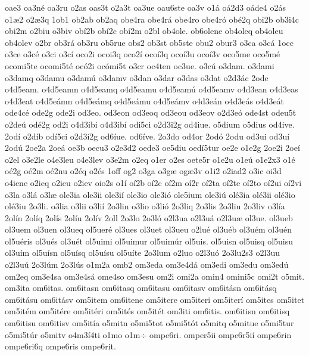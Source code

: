 {oae3
oa3n^^e9
oa3ru
o2as
oas3t
o2a3t
oa3ue
oau6ste
oa3v
o1^^e1
o^^e12d3
o^^e1de4
o2^^e1s
o1^^e62
o2^^e63q
1ob1
ob2ab
ob2aq
obe4ra
obe4r^^e1
obe4ro
obe4r^^f3
ob^^e92q
obi2b
ob3i4c
obi2m
o2biu
o3biv
ob^^ed2b
ob^^ed2c
ob^^ed2m
o2bl
ob4ole.
ob6olene
ob4oleq
ob4oleu
ob4olev
o2br
ob3r^^e1
ob3ru
ob5rue
obs2
ob3st
ob5ste
obu2
obur3
o3ca
o3c^^e1
1occ
o3ce
o3c^^e9
o3ci
o3c^^ed
oco2i
ocoi3q
oco2^^ed
oco^^ed3q
oco^^ed3u
oco^^ed3v
oco5me
oco5m^^e9
ocomi5te
ocomi5t^^e9
oc^^f32i
oc^^f3mi5t
o3cr
oc4ten
oc3ue.
o3c^^fa
o3dam.
o3dami
o3damq
o3damu
o3dam^^fa
o3damv
o3dan
o3dar
o3das
o3dat
o2d3^^e1c
2ode
o4d5eam.
o4d5eamn
o4d5eamq
o4d5eamu
o4d5eam^^fa
o4d5eamv
o4d3ean
o4d3eas
o4d3eat
o4d5e^^e1mn
o4d5e^^e1mq
o4d5e^^e1mu
o4d5e^^e1mv
o4d3e^^e1n
o4d3e^^e1s
o4d3e^^e1t
ode4c^^e9
ode2g
ode2i
od3eo.
od3eon
od3eoq
od3eou
od3eov
o2d3e^^f3
ode4st
odeu5t
o2de^^fa
od^^e92g
od2i
o4d3ibi
o4d3ib^^ed
odi5ci
o2d3i2g
od4iue.
o5dium
o5dius
od4ive.
2od^^ed
o2d^^edb
od^^ed5ci
o2d3^^ed2g
od6^^edue.
od6^^edve.
2o3do
od4or
2od^^f3
2odu
od3ui
od3u^^ed
2od^^fa
2oe2a
2oe^^e1
oe3b
oecu3
o2e3d2
oede3
oe5diu
oed^^ed5tur
oe2e
o1e2g
2oe2i
2oe^^ed
o2el
o3e2le
o4e3leu
o4e3lev
o3e2m
o2eq
o1er
o2es
oete5r
o1e2u
o1e^^fa
o1e2x3
o1^^e9
o^^e92g
o^^e92m
o^^e92nu
o2^^e9q
o2^^e9s
1off
og2
o3ga
o3g^^e6
og^^e63v
o1i2
o2iad2
o3ic
oi3d
o4iene
o2ieq
o2ieu
o2iev
oio2s
o1^^ed
o^^ed2b
o^^ed2c
o^^ed2m
o^^ed2r
o^^ed2ta
o^^ed2te
o^^ed2to
o^^ed2ui
o^^ed2vi
o3la
o3l^^e1
o3l^^e6
ole3ia
ole3ii
ole3i^^ed
ole3io
ole3i^^f3
ole5ium
ole3i^^fa
ol^^e93ia
ol^^e93ii
ol^^e93io
ol^^e93iu
2o3li.
o3lia
o3lii
o3li^^ed
2o3lin
o3lio
o3li^^f3
2o3liq
2o3lis
2o3liu
2o3liv
o3l^^eda
2ol^^edn
2ol^^edq
2ol^^eds
2ol^^edu
2ol^^edv
2oll
2o3lo
2o3l^^f3
o2l3ua
o2l3u^^e1
o2l3u^^e6
ol3ue.
ol3ueb
ol3uem
ol3uen
ol3ueq
ol5uer^^e9
ol3ues
ol3uet
ol3ueu
o2lu^^e9
ol3u^^e9b
ol3u^^e9m
ol3u^^e9n
ol5u^^e9ris
ol3u^^e9s
ol3u^^e9t
ol5uimi
ol5uimur
ol5uim^^far
ol5uis.
ol5uisn
ol5uisq
ol5uisu
ol3u^^edm
ol5u^^edsn
ol5u^^edsq
ol5u^^edsu
ol5u^^edte
2o3lum
o2luo
o2l3u^^f3
2o3lu2s3
o2l3uu
o2l3u^^fa
2o3l^^fam
2o3l^^fas
o1m2a
omb2
om3eda
om3e4d^^e1
om3edi
om3edu
om3ed^^fa
om2eq
om3e4sa
om3e4s^^e1
ome4so
om3esu
om2i
omi2a
omin4
omini5c
omi2t
o5mit.
om3ita
om6itas.
om6itasn
om6itasq
om6itasu
om6itasv
om6it^^e1sn
om6it^^e1sq
om6it^^e1su
om6it^^e1sv
om5item
om6itene
om5itere
om5iteri
om5iter^^ed
om5ites
om5itet
om5it^^e9m
om5it^^e9re
om5it^^e9ri
om5it^^e9s
om5it^^e9t
om3iti
om6itis.
om6itisn
om6itisq
om6itisu
om6itisv
om5it^^eda
o5mitn
o5mi5tot
o5mi5t^^f3t
o5mitq
o5mitue
o5mi5tur
o5mi5t^^far
o5mitv
o4m3^^ed4ti
o1mo
o1m^^f7
ompe6ri.
omper5ii
ompe6r5i^^ed
ompe6rin
ompe6ri6q
ompe6ris
ompe6rit.
}
